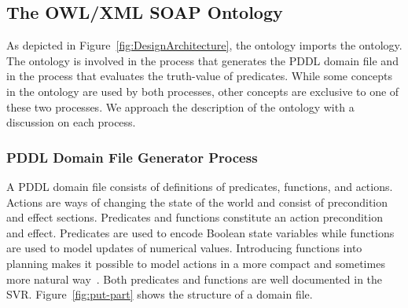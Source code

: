 \subsection{The OWL/XML SOAP Ontology}\label{owlsoap}
As depicted in Figure~\ref{fig:DesignArchitecture}, the 
ontology imports the  ontology. The 
ontology is involved in the process that generates the PDDL domain
file and in the process that evaluates the truth-value of predicates.
While some concepts in the  ontology are used by both
processes, other concepts are exclusive to one of these two processes.
We approach the description of the  ontology with a discussion on each process.

\subsubsection{PDDL Domain File Generator Process}\label{sss:domainfile}
A PDDL domain file consists of definitions of predicates, functions,
and actions. Actions are ways of changing the state of the world and
consist of precondition and effect sections. Predicates and
functions constitute an action precondition and effect. Predicates
are used to encode Boolean state variables while functions are used
to model updates of numerical values. Introducing functions into
planning makes it possible to model actions in a more compact and
sometimes more natural way~\cite{FOX.JAIR.2003}. Both predicates
and functions are well documented in the SVR.
Figure~\ref{fig:put-part} shows the structure of a domain file.

